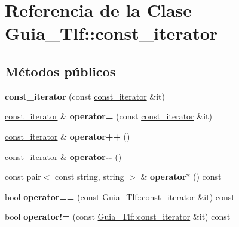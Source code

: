 \hypertarget{classGuia__Tlf_1_1const__iterator}{}\section{Referencia de la Clase Guia\+\_\+\+Tlf\+:\+:const\+\_\+iterator}
\label{classGuia__Tlf_1_1const__iterator}
\subsection*{Métodos públicos}
\begin{DoxyCompactItemize}
\item 
\mbox{\label{classGuia__Tlf_1_1const__iterator_a2dfa3442891de7eaec807c2a44b1a17a}} 
{\bfseries const\+\_\+iterator} (const \hyperlink{classGuia__Tlf_1_1const__iterator}{const\+\_\+iterator} \&it)
\item 
\mbox{\label{classGuia__Tlf_1_1const__iterator_aeb2e8ab478bfad77332b1ee690a88fc5}} 
\hyperlink{classGuia__Tlf_1_1const__iterator}{const\+\_\+iterator} \& {\bfseries operator=} (const \hyperlink{classGuia__Tlf_1_1const__iterator}{const\+\_\+iterator} \&it)
\item 
\mbox{\label{classGuia__Tlf_1_1const__iterator_ab5d632142d7ea9be174db36b7e872540}} 
\hyperlink{classGuia__Tlf_1_1const__iterator}{const\+\_\+iterator} \& {\bfseries operator++} ()
\item 
\mbox{\label{classGuia__Tlf_1_1const__iterator_a89bd0afab6e8bf3326722647badb9517}} 
\hyperlink{classGuia__Tlf_1_1const__iterator}{const\+\_\+iterator} \& {\bfseries operator-\/-\/} ()
\item 
\mbox{\label{classGuia__Tlf_1_1const__iterator_ab5b50091afec34c81c3645a18c9da102}} 
const pair$<$ const string, string $>$ \& {\bfseries operator$\ast$} () const
\item 
\mbox{\label{classGuia__Tlf_1_1const__iterator_ab563ab6317d7d9cc5eefeea819a2efeb}} 
bool {\bfseries operator==} (const \hyperlink{classGuia__Tlf_1_1const__iterator}{Guia\+\_\+\+Tlf\+::const\+\_\+iterator} \&it) const
\item 
\mbox{\label{classGuia__Tlf_1_1const__iterator_a2188f36c1f6b5956ed6a909021378e2f}} 
bool {\bfseries operator!=} (const \hyperlink{classGuia__Tlf_1_1const__iterator}{Guia\+\_\+\+Tlf\+::const\+\_\+iterator} \&it) const
\end{DoxyCompactItemize}
